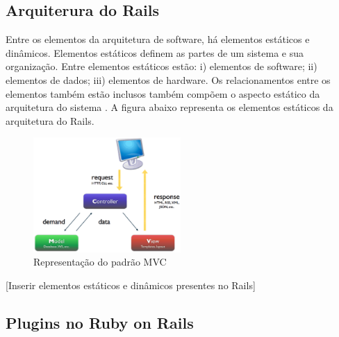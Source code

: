 
\subsection{Arquiterura do Rails}

Entre os elementos da arquitetura de software, há elementos estáticos e dinâmicos. Elementos estáticos definem as partes de um sistema e sua organização. Entre elementos estáticos estão: i) elementos de software; ii) elementos de dados; iii) elementos de hardware. Os relacionamentos entre os elementos também estão inclusos também compõem o aspecto estático da arquitetura do sistema \cite{germoglio2010fundamentos}. A figura abaixo representa os elementos estáticos da arquitetura do Rails.

\graphicspath{{figuras/}}
\begin{figure}[H]
\centering
\includegraphics[width=0.5\textwidth]{mvc}
\caption{Representação do padrão MVC}
\label{mvc}
\end{figure}

[Inserir elementos estáticos e dinâmicos presentes no Rails]

\subsection{Plugins no Ruby on Rails}